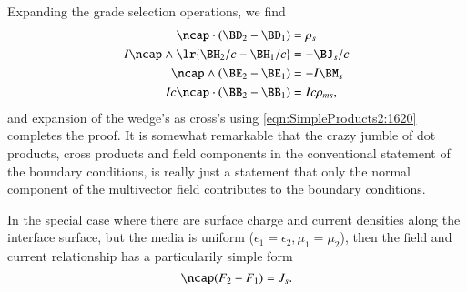 Expanding the grade selection operations, we find
\begin{dmath}\label{eqn:boundarySurfaceSources:440}
\begin{aligned}
\ncap \cdot (\BD_2 - \BD_1) &= \rho_s \\
I \ncap \wedge \lr{ \BH_2/c - \BH_1/c } &= - \BJ_s/c \\
\ncap \wedge (\BE_2 - \BE_1) &= -I \BM_s \\
I c \ncap \cdot (\BB_2 - \BB_1) &= I c \rho_{ms},
\end{aligned}
\end{dmath}
and expansion of the wedge's as cross's using \cref{eqn:SimpleProducts2:1620} completes the proof.  It is somewhat remarkable that the 
crazy jumble of dot products, cross products and field components in the conventional statement of the boundary conditions, is really just a statement that only the normal component of the multivector field contributes to the boundary conditions.

In the special case where there are surface charge and current densities along the interface surface, but the media is uniform (\(\epsilon_1 = \epsilon_2, \mu_1 = \mu_2\)), then the field and current relationship has a particularily simple form \citep{chappell2014geometric}
\begin{dmath}\label{eqn:boundarySurfaceSources:421}
\ncap (F_2 - F_1) = J_s.
\end{dmath}

